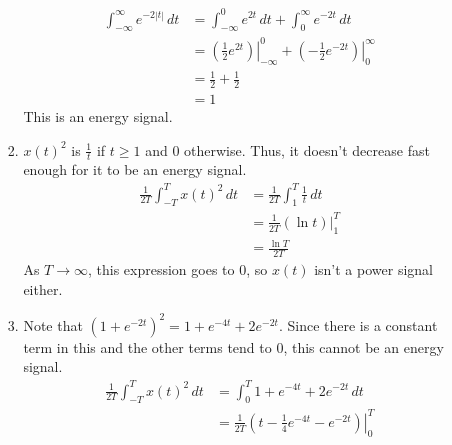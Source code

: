 \documentclass[12pt]{article}
\begin{document}
\begin{enumerate}
\begin{enumerate}
\begin{enumerate}
\begin{align*}
                                          \int_{-\infty}^{\infty} e^{-2|t|}\,dt
                                           & = \int_{-\infty}^{0} e^{2t}\,dt + \int_{0}^{\infty} e^{-2t}\,dt                                                          \\
                                           & = \left.\left(\frac{1}{2}e^{2t}\right)\right|^{0}_{-\infty} + \left.\left(-\frac{1}{2}e^{-2t}\right)\right|^{\infty}_{0} \\
                                           & = \frac{1}{2}+\frac{1}{2}                                                                                                \\
                                           & = \boxed{1}
                                    \end{align*}
                                    This is an energy signal.
                              \item $x(t)^2$ is $\frac{1}{t}$ if $t \ge 1$ and $0$ otherwise.
                                    Thus, it doesn't decrease fast enough for it to be an energy signal.
                                    \begin{align*}
                                          \frac{1}{2T} \int_{-T}^{T} x(t)^2\,dt
                                           & = \frac{1}{2T} \int_{1}^{T} \frac{1}{t}\,dt        \\
                                           & = \frac{1}{2T} \left.\left(\ln t\right)\right|^T_1 \\
                                           & = \frac{\ln T}{2T}
                                    \end{align*}
                                    As $T \rightarrow \infty$, this expression goes to $0$,
                                    so $x(t)$ isn't a power signal either.
                              \item Note that $\left(1+e^{-2t}\right)^2=1+e^{-4t}+2e^{-2t}$.
                                    Since there is a constant term in this and the other terms
                                    tend to $0$, this cannot be an energy signal.
                                    \begin{align*}
                                          \frac{1}{2T}\int_{-T}^{T} x(t)^2\,dt
                                           & = \int_{0}^{T} 1+e^{-4t}+2e^{-2t}\,dt                                                             \\
                                           & = \frac{1}{2T}\left.\left(t-\frac{1}{4}e^{-4t}-e^{-2t}\right)\right|^{T}_{0}                      \\

\end{align*}
\end{enumerate}
\end{enumerate}
\end{enumerate}
\end{document}
